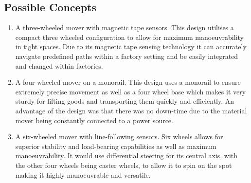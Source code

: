 \documentclass[12pt,titlepage]{article}
\begin{document}
\subsection{Possible Concepts}
 
\begin{enumerate}
     \item A three-wheeled mover with magnetic tape sensors. This design utilises a compact three wheeled configuration to allow for maximum manoeuvrability in tight spaces. Due to its magnetic tape sensing technology it can accurately navigate predefined paths within a factory setting and be easily integrated and changed within factories.
    \item A four-wheeled mover on a monorail. This design uses a monorail to ensure extremely precise movement as well as a four wheel base which makes it very sturdy for lifting goods and transporting them quickly and efficiently. An advantage of the design was that there was no down-time due to the material mover being constantly connected to a power source.
    \item A six-wheeled mover with line-following sensors. Six wheels allows for superior stability and load-bearing capabilities as well as maximum manoeuvrability. It would use differential steering for its central axis, with the other four wheels being caster wheels, to allow it to spin on the spot making it highly manoeuvrable and versatile.
 \end{enumerate}
\end{document}
